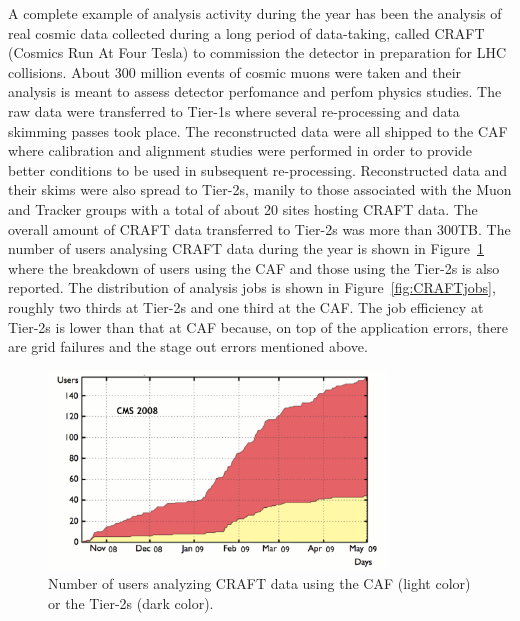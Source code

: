 A complete example of analysis activity during the year has been the analysis 
of real cosmic data collected during a long period of data-taking, called CRAFT (Cosmics Run At Four Tesla) to commission the detector in preparation for LHC collisions. About 300 million events of cosmic muons were taken and their analysis is meant to assess detector perfomance and perfom physics studies.
The raw data were transferred to Tier-1s where several re-processing and data skimming passes took place. The reconstructed data were all shipped to the CAF where calibration and alignment studies were performed in order to provide better conditions to be used in subsequent re-processing. 
Reconstructed data and their skims were also spread to Tier-2s, manily to 
those associated with the Muon and Tracker groups with a total of about 20 sites hosting CRAFT data. The overall amount of CRAFT data transferred to Tier-2s was more than 300TB.
The number of users analysing CRAFT data during the year is shown in Figure~\ref{fig:CRAFTusers} where the breakdown of users using the CAF and those using the Tier-2s is also reported. The distribution of analysis jobs is shown in Figure~\ref{fig:CRAFTjobs}, roughly two thirds at Tier-2s and one third at the CAF.
The job efficiency at Tier-2s is lower than that at CAF because, on top of the application errors, there are grid failures and the stage out errors mentioned above.
%
\begin{figure}
\centering
\includegraphics[width=0.80\textwidth]{CRAFTusers.eps}
\caption{Number of users analyzing CRAFT data using the CAF (light color) or the Tier-2s (dark color).}
\label{fig:CRAFTusers}
\end{figure}
